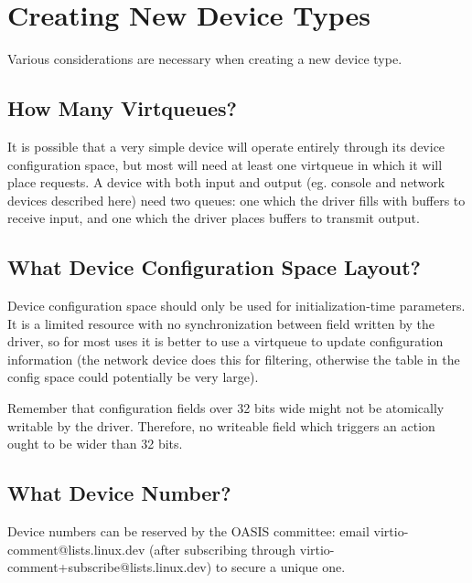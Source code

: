 \chapter{Creating New Device Types}\label{sec:Creating New Device Types}

Various considerations are necessary when creating a new device
type.

\section{How Many Virtqueues?}\label{sec:Creating New Device Types / How Many Virtqueues?}

It is possible that a very simple device will operate entirely
through its device configuration space, but most will need at least one
virtqueue in which it will place requests. A device with both
input and output (eg. console and network devices described here)
need two queues: one which the driver fills with buffers to
receive input, and one which the driver places buffers to
transmit output.

\section{What Device Configuration Space Layout?}\label{sec:Creating New Device Types / What Device Configuration Space Layout?}

Device configuration space should only be used for initialization-time
parameters.  It is a limited resource with no synchronization between
field written by the driver, so for most uses it is better to use a virtqueue to update
configuration information (the network device does this for filtering,
otherwise the table in the config space could potentially be very
large).

Remember that configuration fields over 32 bits wide might not be atomically
writable by the driver.  Therefore, no writeable field which triggers an
action ought to be wider than 32 bits.

\section{What Device Number?}\label{sec:Creating New Device Types / What Device Number?}

Device numbers can be reserved by the OASIS committee: email
virtio-comment@lists.linux.dev (after subscribing through
virtio-comment+subscribe@lists.linux.dev) to secure a unique one.

